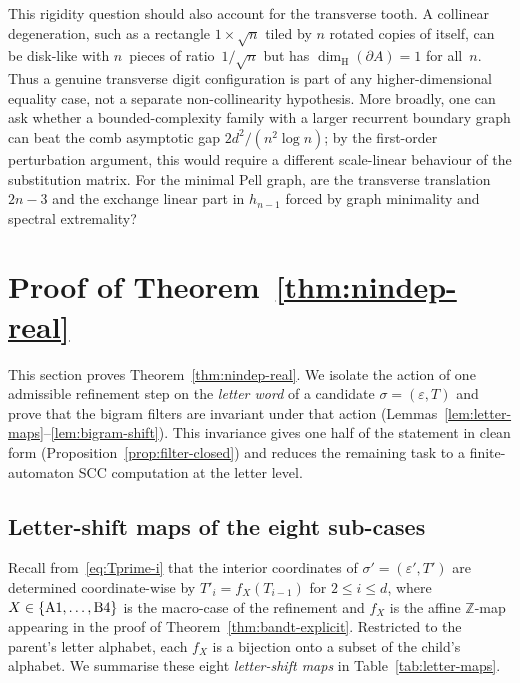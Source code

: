 \documentclass{amsart}
\theoremstyle{definition}
\theoremstyle{remark}
\newcommand{\dH}{\dim_{\mathrm{H}}}
\begin{document}
\begin{enumerate}
This rigidity question should also account for the transverse tooth.
A collinear degeneration, such as a rectangle $1 \times \sqrt{n}$
tiled by $n$ rotated copies of itself, can be disk-like with
$n$~pieces of ratio~$1/\!\sqrt{n}$ but has
$\dH(\partial A)=1$ for all~$n$.  Thus a genuine transverse digit
configuration is part of any higher-dimensional equality case, not a
separate non-collinearity hypothesis.  More broadly, one can ask
whether a bounded-complexity family with a larger recurrent boundary
graph can beat the comb asymptotic gap
$2d^2/(n^2\log n)$; by the first-order perturbation argument, this
would require a different scale-linear behaviour of the substitution
matrix.  For the minimal Pell graph, are the transverse translation
$2n{-}3$ and the exchange linear part in $h_{n-1}$ forced by graph
minimality and spectral extremality?

\end{enumerate}

\appendix

\section{Proof of Theorem~\ref{thm:nindep-real}}
\label{sec:proof-strategy}

This section proves Theorem~\ref{thm:nindep-real}.  We isolate
the action of one admissible refinement step on the
\emph{letter word} of a candidate $\sigma = (\varepsilon, T)$
and prove that the bigram filters are invariant under that
action
\textup{(}Lemmas~\ref{lem:letter-maps}--\ref{lem:bigram-shift}\textup{)}.
This invariance gives one half of the statement in clean form
\textup{(}Proposition~\ref{prop:filter-closed}\textup{)} and
reduces the remaining task to a finite-automaton SCC computation
at the letter level.

\subsection{Letter-shift maps of the eight sub-cases}
\label{ssec:letter-maps}

Recall from~\eqref{eq:Tprime-i} that the interior coordinates of
$\sigma' = (\varepsilon', T')$ are determined coordinate-wise by
$T'_i = f_X(T_{i-1})$ for $2 \le i \le d$, where $X \in
\{\textup{A1}, \ldots, \textup{B4}\}$ is the macro-case of the
refinement and $f_X$ is the affine $\mathbb{Z}$-map appearing in the
proof of Theorem~\ref{thm:bandt-explicit}.  Restricted to the
parent's letter alphabet, each $f_X$ is a bijection onto a subset of
the child's alphabet.  We summarise these eight \emph{letter-shift
maps} in Table~\ref{tab:letter-maps}.
\end{document}
